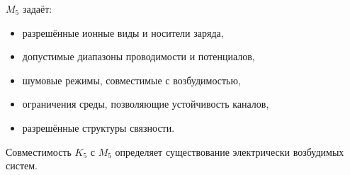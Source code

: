 $M_5$ задаёт:
\begin{itemize}
    \item разрешённые ионные виды и носители заряда,
    \item допустимые диапазоны проводимости и потенциалов,
    \item шумовые режимы, совместимые с возбудимостью,
    \item ограничения среды, позволяющие устойчивость каналов,
    \item разрешённые структуры связности.
\end{itemize}

Совместимость $K_5$ с $M_5$ определяет существование
электрически возбудимых систем.
